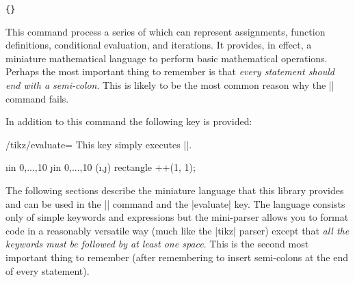 \begin{command}{\tikzmath\texttt{\{}\texttt{\}}}

  This command process  a series of  which can 
  represent assignments, function definitions, conditional evaluation,
  and iterations. It provides, in effect,  a miniature mathematical
  language to perform basic mathematical operations.
  Perhaps the most important thing to remember is that \emph{every 
  statement should end with a semi-colon}. This is
  likely to be the most common reason why the |\tikzmath| command fails.

\begin{codeexample}[]
\end{codeexample}

\end{command}

In addition to this command the following key is provided:
  
\begin{key}{/tikz/evaluate={}}
  This key simply executes ||.
  
\begin{codeexample}[]
\tikz[x=0.25cm,y=0.25cm,
  evaluate={
    int \i, \j;
    for \i in {0,...,10}{
      for \j in {0,...,10}{
        \a{\i,\j} = (\i+\j)*5;
      };
    };
  }
]
\foreach \i in {0,...,10}
  \foreach \j in {0,...,10}
      (\i,\j) rectangle ++(1, 1);

\end{codeexample}


\end{key}


  The following sections describe the miniature language that this
  library provides and   can be used in the |\tikzmath| command and the |evaluate| key.
  The language consists only of simple keywords and expressions but
  the mini-parser allows you to format code in a reasonably versatile
  way (much like the |tikz| parser) except that 
  \emph{all the keywords must be followed by at least one space}.
  This is the second most important thing to remember (after 
  remembering to insert semi-colons at the end of every statement).



